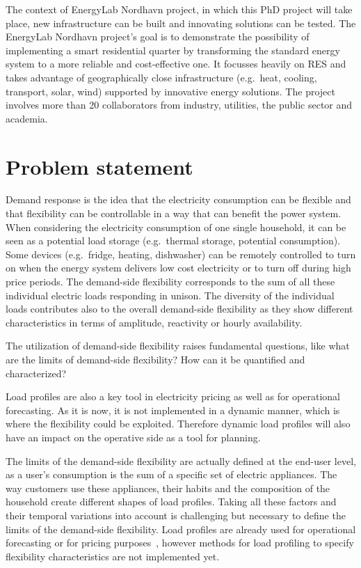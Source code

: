 \documentclass[fleqn,a4paper,twoside,10pt]{article}
\begin{document}
	The context of EnergyLab Nordhavn project, in which this PhD project will take place, new infrastructure can be built and innovating solutions can be tested. The EnergyLab Nordhavn project's goal is to demonstrate the possibility of implementing a smart residential quarter by transforming the standard energy system to a more reliable and cost-effective one. It focusses heavily on RES and takes advantage of geographically close infrastructure (e.g.\ heat, cooling, transport, solar, wind) supported by innovative energy solutions. The project involves more than 20 collaborators from industry, utilities, the public sector and academia.

\section{Problem statement}
	Demand response is the idea that the electricity consumption can be flexible and that flexibility can be controllable in a way that can benefit the power system. When considering the electricity consumption of one single household, it can be seen as a potential load storage (e.g.\ thermal storage, potential consumption). Some devices (e.g.\ fridge, heating, dishwasher) can be remotely controlled to turn on when the energy system delivers low cost electricity or to turn off during high price periods. The demand-side flexibility corresponds to the sum of all these individual electric loads responding in unison. The diversity of the individual loads contributes also to the overall demand-side flexibility as they show different characteristics in terms of amplitude, reactivity or hourly availability.
	
	The utilization of demand-side flexibility raises fundamental questions, like what are the limits of demand-side flexibility? How can it be quantified and characterized? 

	Load profiles are also a key tool in electricity pricing as well as for operational forecasting. As it is now, it is not implemented in a dynamic manner, which is where the flexibility could be exploited. Therefore dynamic load profiles will also have an impact on the operative side as a tool for planning.
	
	The limits of the demand-side flexibility are actually defined at the end-user level, as a user's consumption is the sum of a specific set of electric appliances. The way customers use these appliances, their habits and the composition of the household create different shapes of load profiles. Taking all these factors and their temporal variations into account is challenging but necessary to define the limits of the demand-side flexibility. Load profiles are already used for operational forecasting or for pricing purposes~\cite{Ramos2013,figueiredo2005,kitayama2002}, however methods for load profiling to specify flexibility characteristics are not implemented yet.
\end{document}
